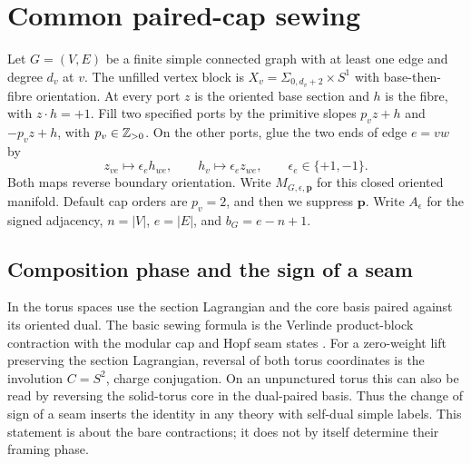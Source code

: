 \section{Common paired-cap sewing}\label{sec:sewing}

Let \(G=(V,E)\) be a finite simple connected graph with at least one
edge and degree \(d_v\) at \(v\). The unfilled vertex block is
\(X_v=\Sigma_{0,d_v+2}\times S^1\) with base-then-fibre orientation.
At every port \(z\) is the oriented base section and \(h\) is the
fibre, with \(z\cdot h=+1\). Fill two specified ports by the primitive
slopes \(p_vz+h\) and \(-p_vz+h\), with \(p_v\in\mathbb Z_{>0}\).
On the other ports, glue the two ends of edge \(e=vw\) by
\[
        z_{ve}\longmapsto \epsilon_e h_{we},\qquad
        h_v\longmapsto \epsilon_e z_{we},\qquad \epsilon_e\in\{+1,-1\}.
\]
Both maps reverse boundary orientation. Write \(M_{G,\epsilon,\mathbf p}\)
for this closed oriented manifold. Default cap orders are \(p_v=2\), and
then we suppress \(\mathbf p\). Write \(A_\epsilon\) for the signed
adjacency, \(n=|V|\), \(e=|E|\), and \(b_G=e-n+1\).

\subsection{Composition phase and the sign of a seam}

In the torus spaces use the section Lagrangian and the core basis
paired against its oriented dual. The basic sewing formula is the
Verlinde product-block contraction with the modular cap and Hopf seam
states \cite{BHMV,P50,P50B}. For a zero-weight lift preserving the
section Lagrangian, reversal of both torus coordinates is the
involution \(C=S^2\), charge conjugation. On an unpunctured torus this
can also be read by reversing the solid-torus core in the dual-paired
basis. Thus the change of sign of a seam inserts the identity in any
theory with self-dual simple labels. This statement is about the bare
contractions; it does not by itself determine their framing phase.

